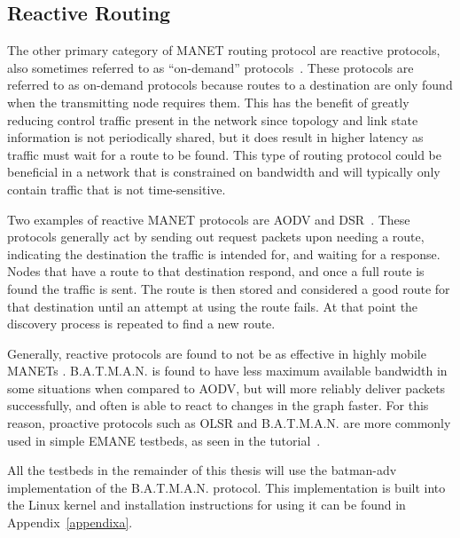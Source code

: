 \subsection{Reactive Routing}
The other primary category of MANET routing protocol are reactive protocols, also sometimes referred to as ``on-demand'' protocols~\cite{manet_survey}.
These protocols are referred to as on-demand protocols because routes to a destination are only found when the transmitting node requires them.
This has the benefit of greatly reducing control traffic present in the network since topology and link state information is not periodically shared, but it does result in higher latency as traffic must wait for a route to be found.
This type of routing protocol could be beneficial in a network that is constrained on bandwidth and will typically only contain traffic that is not time-sensitive.\par
Two examples of reactive MANET protocols are AODV and DSR~\cite{reactive_routing}.
These protocols generally act by sending out request packets upon needing a route, indicating the destination the traffic is intended for, and waiting for a response.
Nodes that have a route to that destination respond, and once a full route is found the traffic is sent.
The route is then stored and considered a good route for that destination until an attempt at using the route fails.
At that point the discovery process is repeated to find a new route.\par
Generally, reactive protocols are found to not be as effective in highly mobile MANETs \cite{aodv_batman,reactive_routing}.
B.A.T.M.A.N. is found to have less maximum available bandwidth in some situations when compared to AODV, but will more reliably deliver packets successfully, and often is able to react to changes in the graph faster.
For this reason, proactive protocols such as OLSR and B.A.T.M.A.N. are more commonly used in simple EMANE testbeds, as seen in the tutorial~\cite{emane_tutorial}.\par
All the testbeds in the remainder of this thesis will use the batman-adv implementation of the B.A.T.M.A.N. protocol.
This implementation is built into the Linux kernel and installation instructions for using it can be found in Appendix~\ref{appendixa}.

